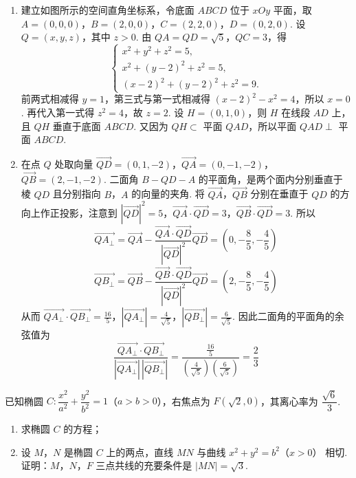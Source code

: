 \begin{solution}
\begin{enumerate}
\item 建立如图所示的空间直角坐标系，令底面 \(ABCD\) 位于 \(xOy\) 平面，取
\(A=(0,0,0)\)，\(B=(2,0,0)\)，\(C=(2,2,0)\)，\(D=(0,2,0)\).
设 \(Q=(x,y,z)\)，其中 \(z>0\). 由 \(QA=QD=\sqrt5\)，\(QC=3\)，得
\[
\begin{cases}
x^2+y^2+z^2=5,\\
x^2+(y-2)^2+z^2=5,\\
(x-2)^2+(y-2)^2+z^2=9.
\end{cases}
\]
前两式相减得 \(y=1\)，第三式与第一式相减得 \((x-2)^2-x^2=4\)，所以 \(x=0\). 再代入第一式得 \(z^2=4\)，故 \(z=2\). 设 \(H=(0,1,0)\)，则 \(H\) 在线段 \(AD\) 上，且 \(QH\) 垂直于底面 \(ABCD\). 又因为 \(QH\subset\) 平面 \(QAD\)，所以平面 \(QAD\perp\) 平面 \(ABCD\).

\item 在点 \(Q\) 处取向量 \(\overrightarrow{QD}=(0,1,-2)\)，\(\overrightarrow{QA}=(0,-1,-2)\)，\(\overrightarrow{QB}=(2,-1,-2)\).
二面角 \(B-QD-A\) 的平面角，是两个面内分别垂直于棱 \(QD\) 且分别指向 \(B\)，\(A\) 的向量的夹角. 将 \(\overrightarrow{QA}\)，\(\overrightarrow{QB}\) 分别在垂直于 \(QD\) 的方向上作正投影，注意到 \(|\overrightarrow{QD}|^2=5\)，\(\overrightarrow{QA}\cdot\overrightarrow{QD}=3\)，\(\overrightarrow{QB}\cdot\overrightarrow{QD}=3\).
所以
\[
\overrightarrow{QA_\perp}=\overrightarrow{QA}-\frac{\overrightarrow{QA}\cdot\overrightarrow{QD}}{|\overrightarrow{QD}|^2}\overrightarrow{QD}=\left(0,-\frac85,-\frac45\right)
\]
\[
\overrightarrow{QB_\perp}=\overrightarrow{QB}-\frac{\overrightarrow{QB}\cdot\overrightarrow{QD}}{|\overrightarrow{QD}|^2}\overrightarrow{QD}=\left(2,-\frac85,-\frac45\right)
\]
从而 \(\overrightarrow{QA_\perp}\cdot\overrightarrow{QB_\perp}=\frac{16}{5}\)，\(|\overrightarrow{QA_\perp}|=\frac{4}{\sqrt5}\)，\(|\overrightarrow{QB_\perp}|=\frac{6}{\sqrt5}\).
因此二面角的平面角的余弦值为
\[
\frac{\overrightarrow{QA_\perp}\cdot\overrightarrow{QB_\perp}}{|\overrightarrow{QA_\perp}|\,|\overrightarrow{QB_\perp}|}=\frac{\frac{16}{5}}{(\frac{4}{\sqrt5})(\frac{6}{\sqrt5})}=\frac23
\]
\end{enumerate}
\end{solution}

\begin{problem}
已知椭圆 \(C:\dfrac{x^2}{a^2}+\dfrac{y^2}{b^2}=1\)（\(a>b>0\)），右焦点为 \(F\left(\sqrt2,0\right)\)，其离心率为 \(\dfrac{\sqrt6}{3}\).

\begin{enumerate}
\item 求椭圆 \(C\) 的方程；
\item 设 \(M\)，\(N\) 是椭圆 \(C\) 上的两点，直线 \(MN\) 与曲线 \(x^2+y^2=b^2\)（\(x>0\)） 相切. 证明：\(M\)，\(N\)，\(F\) 三点共线的充要条件是 \(|MN|=\sqrt3\).
\end{enumerate}
\end{problem}

